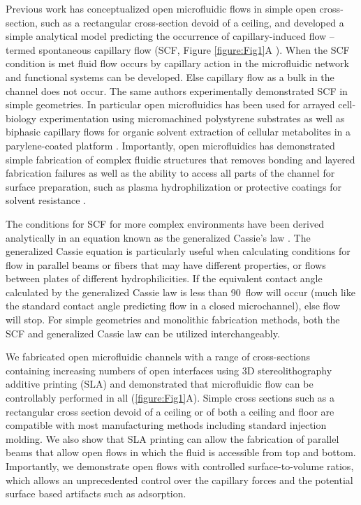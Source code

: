 Previous work has conceptualized open microfluidic flows in simple open cross-section, such as a rectangular cross-section devoid of a ceiling, and developed a simple analytical model predicting the occurrence of capillary-induced flow -- termed spontaneous capillary flow (SCF, Figure \ref{figure:Fig1}A \cite{Casavant2013}). When the SCF condition is met fluid flow occurs by capillary action in the microfluidic network and functional systems can be developed. Else capillary flow as a bulk in the channel does not occur. The same authors experimentally demonstrated SCF in simple geometries. In particular open microfluidics has been used for arrayed cell-biology experimentation using micromachined polystyrene substrates \cite{Berthier2012SuspendedStudies} as well as biphasic capillary flows for organic solvent extraction of cellular metabolites in a parylene-coated platform \cite{Barkal2016,Berthier2012SuspendedStudies}. Importantly, open microfluidics has demonstrated simple fabrication of complex fluidic structures that removes bonding and layered fabrication failures as well as the ability to access all parts of the channel for surface preparation, such as plasma hydrophilization or protective coatings for solvent resistance \cite{Piraino2012}. 

The conditions for SCF for more complex environments have been derived analytically in an equation known as the generalized Cassie's law \cite{Berthier2014AMicrochannels}. The generalized Cassie equation is particularly useful when calculating conditions for flow in parallel beams or fibers that may have different properties, or flows between plates of different hydrophilicities. If the equivalent contact angle calculated by the generalized Cassie law is less than 90\textdegree \, flow will occur (much like the standard contact angle predicting flow in a closed microchannel), else flow will stop.  For simple geometries and monolithic fabrication methods, both the SCF and generalized Cassie law can be utilized interchangeably. 

We fabricated open microfluidic channels with a range of cross-sections containing increasing numbers of open interfaces using 3D stereolithography additive printing (SLA) and demonstrated that microfluidic flow can be controllably performed in all (\ref{figure:Fig1}A). Simple cross sections such as a rectangular cross section devoid of a ceiling or of both a ceiling and floor are compatible with most manufacturing methods including standard injection molding. We also show that SLA printing can allow the fabrication of parallel beams that allow open flows in which the fluid is accessible from top and bottom. Importantly, we demonstrate open flows with controlled surface-to-volume ratios, which allows an unprecedented control over the capillary forces and the potential surface based artifacts such as adsorption. 

